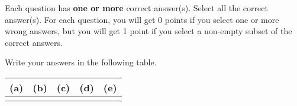 
Each question has \textbf{one or more} correct answer(s). Select all the correct answer(s). For each question, you will get 0 points if you select one or more wrong answers, but you will get 1 point if you select a non-empty subset of the correct answers.

Write your answers in the following table.


\begin{table}[htbp]
	\centering
	\begin{tabular}{|p{2cm}|p{2cm}|p{2cm}|p{2cm}|p{2cm}|}
		\hline 
		(a) & (b) & (c) & (d) & (e) \\
		\hline
		   &  &  &  &  \\
		\hline
	\end{tabular} 
\end{table}


